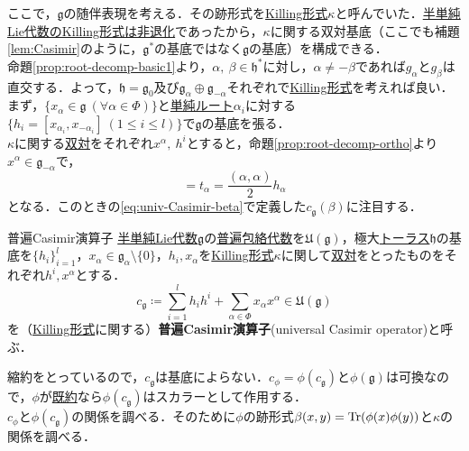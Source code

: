 \documentclass[rep_main]{subfiles}
\begin{document}
ここで，$\mathfrak{g}$の随伴表現を考える．その跡形式を\hyperref[def:Killing-form]{Killing形式}$\kappa$と呼んでいた．\hyperref[thm:semisimple-LieAlg-iff]{半単純Lie代数のKilling形式は非退化}であったから，$\kappa$に関する双対基底（ここでも補題\ref{lem:Casimir}のように，$\mathfrak{g}^*$の基底ではなく$\mathfrak{g}$の基底）を構成できる．\\
命題\ref{prop:root-decomp-basic1}より，$\alpha,\ \beta \in \mathfrak{h}^*$に対し，$\alpha \neq -\beta$であれば$g_\alpha$と$g_\beta$は直交する．よって，$\mathfrak{h} = \mathfrak{g}_0$及び$\mathfrak{g}_\alpha \oplus \mathfrak{g}_{-\alpha}$それぞれで\hyperref[def:Killing-form]{Killing形式}を考えれば良い．\\
まず，$\{x_\alpha \in \mathfrak{g}\ (\forall \alpha \in \Phi)\}$と\hyperref[def:base-root]{単純ルート}$\alpha_i$に対する$\{h_i = [x_{\alpha_i}, x_{-\alpha_i}]\ (1 \leq i \leq l)\}$で$\mathfrak{g}$の基底を張る．\\
$\kappa$に関する\hyperref[lem:Casimir]{双対}をそれぞれ$x^\alpha,\ h^i$とすると，命題\ref{prop:root-decomp-ortho}より$x^\alpha \in \mathfrak{g}_{-\alpha}$で，
\begin{equation}
	[x_\alpha, x^\alpha] = t_\alpha = \frac{(\alpha, \alpha)}{2}h_\alpha
\end{equation}
となる．このときの\eqref{eq:univ-Casimir-beta}で定義した$c_\mathfrak{g}(\beta)$に注目する．
\begin{mydef}[label=def:univ-Casimir-op]{普遍Casimir演算子}
	\hyperref[def:semisimple-LieAlg]{半単純Lie代数}$\mathfrak{g}$の\hyperref[def:univ-env-alg]{普遍包絡代数}を$\mathfrak{U}(\mathfrak{g})$，極大\hyperref[def:toral-subLieAlg]{トーラス}$\mathfrak{h}$の基底を$\{h_i\}_{i=1}^l$，$x_\alpha \in \mathfrak{g}_\alpha \setminus \{0\}$，$h_i, x_\alpha$を\hyperref[def:Killing-form]{Killing形式}$\kappa$に関して\hyperref[lem:Casimir]{双対}をとったものをそれぞれ$h^i, x^\alpha$とする．
	\begin{equation}
		c_\mathfrak{g} \coloneqq \sum_{i=1}^l h_ih^i + \sum_{\alpha \in \Phi} x_\alpha x^\alpha \in \mathfrak{U}(\mathfrak{g})
	\end{equation}
	を（\hyperref[def:Killing-form]{Killing形式}に関する）\textbf{普遍Casimir演算子}(universal Casimir operator)と呼ぶ．
\end{mydef}
縮約をとっているので，$c_\mathfrak{g}$は基底によらない．$c_\phi = \phi(c_\mathfrak{g})$と$\phi(\mathfrak{g})$は可換なので，$\phi$が\hyperref[def:irr]{既約}なら$\phi(c_\mathfrak{g})$はスカラーとして作用する．\\
$c_\phi$と$\phi(c_\mathfrak{g})$の関係を調べる．そのために$\phi$の跡形式$\beta(x, y) = \Tr(\phi(x)\phi(y))$と$\kappa$の関係を調べる．
\end{document}
